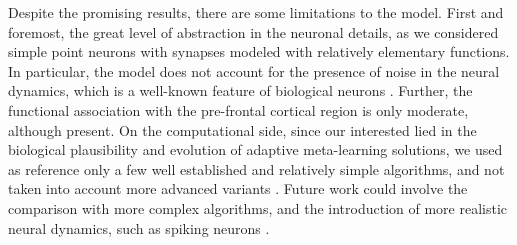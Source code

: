 Despite the promising results, there are some limitations to the model. First and foremost, the great level of abstraction in the neuronal details, as we considered simple point neurons with synapses modeled with relatively elementary functions.
In particular, the model does not account for the presence of noise in the neural dynamics, which is a well-known feature of biological neurons \cite{faisalNoiseNeuronsOther2012}.
Further, the functional association with the pre-frontal cortical region is only moderate, although present.
On the computational side, since our interested lied in the biological plausibility and evolution of adaptive meta-learning solutions, we used as reference only a few well established and relatively simple algorithms, and not taken into account more advanced variants
\cite{tokicAdaptiveEGreedyExploration2010, tokicValueDifferenceBasedExploration2011, qiForcedExplorationBandit2023}.
Future work could involve the comparison with more complex algorithms, and the introduction of more realistic neural dynamics, such as spiking neurons \cite{nunesSpikingNeuralNetworks2022}.

